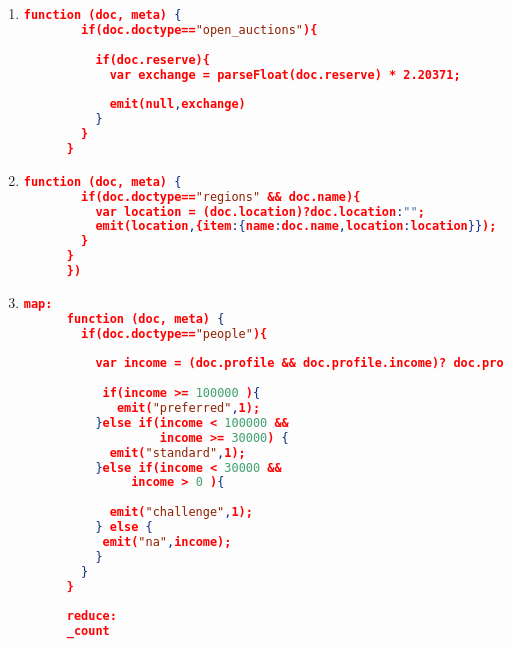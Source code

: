 \begin{enumerate}[label=Q\arabic*.]
    \item %
	\begin{lstlisting}[language=JSON]
	  function (doc, meta) {
	    if(doc.doctype=="open_auctions"){
	      
	      if(doc.reserve){
	      	var exchange = parseFloat(doc.reserve) * 2.20371;
	        
	        emit(null,exchange)
	      } 
	    }
	  }
	\end{lstlisting}	

    \item %
	\begin{lstlisting}[language=JSON]
	  function (doc, meta) {
	    if(doc.doctype=="regions" && doc.name){
	      var location = (doc.location)?doc.location:"";
	      emit(location,{item:{name:doc.name,location:location}});
	    }
	  }
	  })
	\end{lstlisting}	
    \item %
	\begin{lstlisting}[language=JSON]
	  map:
	  function (doc, meta) {
	    if(doc.doctype=="people"){
	   
	      var income = (doc.profile && doc.profile.income)? doc.profile.income : 0;
	  
	       if(income >= 100000 ){
	    	 emit("preferred",1);
	      }else if(income < 100000 && 
	               income >= 30000) {
	        emit("standard",1);
	      }else if(income < 30000 &&
	           income > 0 ){
	       
	        emit("challenge",1);
	      } else {
	       emit("na",income);
	      }
	    }
	  }
	  
	  reduce:
	  _count
	\end{lstlisting}

\end{enumerate}
